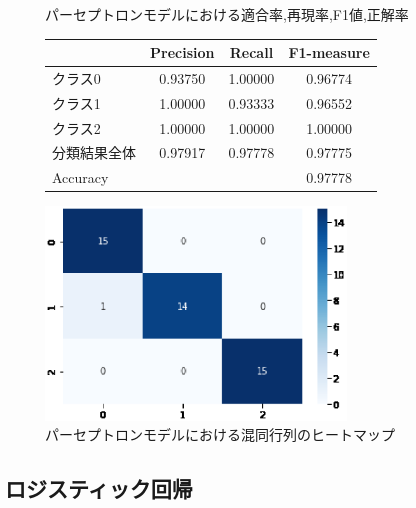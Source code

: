 \documentclass{jarticle}     %
\makeatletter
\newcommand{\tblcaption}[1]{\def\@captype{table}\caption{#1}}
\makeatother
\begin{document}
\begin{figure}[h]
  \def\@captype{table}
  \begin{minipage}[c]{.48\textwidth}
    \tblcaption{パーセプトロンモデルにおける適合率,再現率,F1値,正解率}
      \label{table:パーセプトロン}
    \centering
      \begin{tabular}{lccc}
        \hline
        & Precision  &  Recall &  F1-measure \\
        \hline
        クラス0  & 0.93750  & 1.00000 & 0.96774 \\
        クラス1  & 1.00000  & 0.93333 & 0.96552 \\
        クラス2  & 1.00000  & 1.00000 & 1.00000 \\
        分類結果全体  &  0.97917  &  0.97778 & 0.97775 \\
        \hline
        Accuracy & & & 0.97778\\
        \hline
      \end{tabular}
  \end{minipage}
  \hfill
  \begin{minipage}[c]{.48\textwidth}
    \includegraphics[width=80mm]{assets/ppn_heatmap.eps}
    \caption{パーセプトロンモデルにおける混同行列のヒートマップ}
    \label{fig:パーセプトロン}
  \end{minipage}
\end{figure}


\subsection{ロジスティック回帰}
\end{document}
